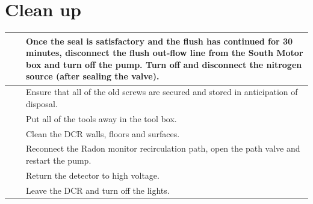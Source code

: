 \documentclass[11pt]{article}
\begin{document}
\section{Clean up}
\newcommand\clean{\stepcounter{cleancounter}\thecleancounter}
\begin{tabular}{|c|c|p{14cm}|}
\hline\clean & & Once the seal is satisfactory and the flush has continued for 30 minutes, disconnect the flush out-flow line from the South Motor box and turn off the pump. Turn off and disconnect the nitrogen source (after sealing the valve).\\
\hline\clean & & Ensure that all of the old screws are secured and stored in anticipation of disposal. \\
\hline\clean & & Put all of the tools away in the tool box. \\
\hline\clean & & Clean the DCR walls, floors and surfaces. \\
\hline\clean & & Reconnect the Radon monitor recirculation path, open the path valve and restart the pump. \\
\hline\clean & & Return the detector to high voltage. \\
\hline\clean & & Leave the DCR and turn off the lights. \\
\hline 
\end{tabular}
\end{document}
